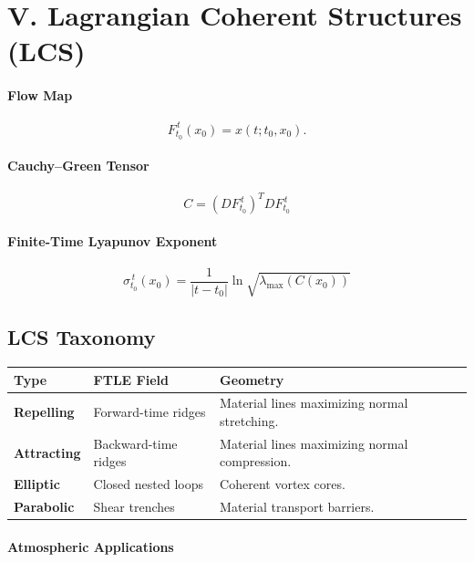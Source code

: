 \documentclass[11pt]{article}
\begin{document}
\section*{V. Lagrangian Coherent Structures (LCS)}

\paragraph{Flow Map}

\[
F_{t_0}^{\,t}(x_0)=x(t; t_0, x_0).
\]

\paragraph{Cauchy--Green Tensor}

\[
\boxed{
C=(DF_{t_0}^{\,t})^{T}DF_{t_0}^{\,t}
}
\]

\paragraph{Finite-Time Lyapunov Exponent}

\[
\boxed{
\sigma_{t_0}^{\,t}(x_0)
=
\frac{1}{|t-t_0|}
\ln
\sqrt{\lambda_{\max}(C(x_0))}
}
\]

\subsection*{LCS Taxonomy}

\begin{longtable}{>{\bfseries}p{}p{}p{}}
Type & FTLE Field & Geometry\\
\midrule

Repelling &
Forward-time ridges &
Material lines maximizing normal stretching.\\

Attracting &
Backward-time ridges &
Material lines maximizing normal compression.\\

Elliptic &
Closed nested loops &
Coherent vortex cores.\\

Parabolic &
Shear trenches &
Material transport barriers.
\end{longtable}

\paragraph{Atmospheric Applications}
\end{document}
